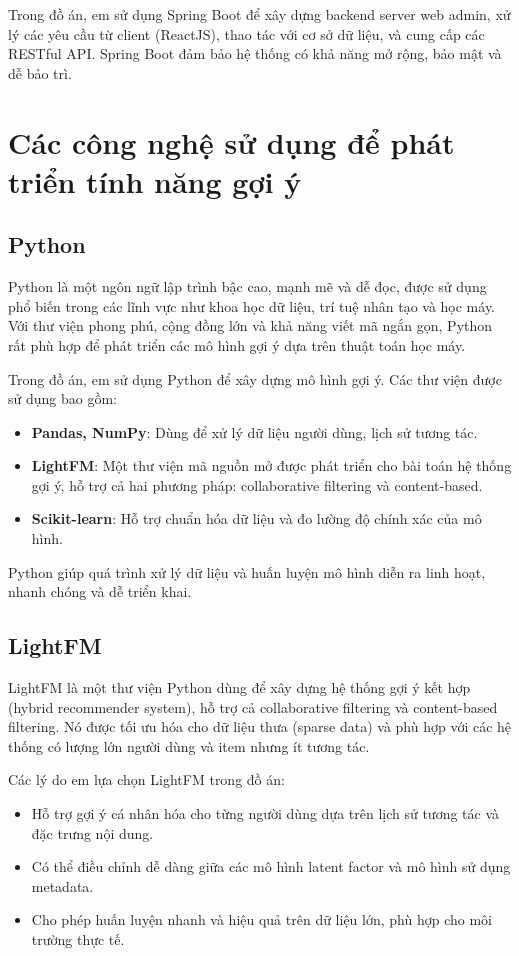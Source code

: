 \documentclass[../DoAn.tex]{subfiles}
\begin{document}
Trong đồ án, em sử dụng Spring Boot để xây dựng backend server web admin, xử lý các yêu cầu từ client (ReactJS), thao tác với cơ sở dữ liệu, và cung cấp các RESTful API. Spring Boot đảm bảo hệ thống có khả năng mở rộng, bảo mật và dễ bảo trì.

\section{Các công nghệ sử dụng để phát triển tính năng gợi ý}

\subsection{Python\cite{Python}}
Python là một ngôn ngữ lập trình bậc cao, mạnh mẽ và dễ đọc, được sử dụng phổ biến trong các lĩnh vực như khoa học dữ liệu, trí tuệ nhân tạo và học máy. Với thư viện phong phú, cộng đồng lớn và khả năng viết mã ngắn gọn, Python rất phù hợp để phát triển các mô hình gợi ý dựa trên thuật toán học máy.

Trong đồ án, em sử dụng Python để xây dựng mô hình gợi ý. Các thư viện được sử dụng bao gồm:
\begin{itemize}
    \item \textbf{Pandas, NumPy}: Dùng để xử lý dữ liệu người dùng, lịch sử tương tác.
    \item \textbf{LightFM}: Một thư viện mã nguồn mở được phát triển cho bài toán hệ thống gợi ý, hỗ trợ cả hai phương pháp: collaborative filtering và content-based.
    \item \textbf{Scikit-learn}: Hỗ trợ chuẩn hóa dữ liệu và đo lường độ chính xác của mô hình.
\end{itemize}
Python giúp quá trình xử lý dữ liệu và huấn luyện mô hình diễn ra linh hoạt, nhanh chóng và dễ triển khai.

\subsection{LightFM\cite{LightFM}}
LightFM là một thư viện Python dùng để xây dựng hệ thống gợi ý kết hợp (hybrid recommender system), hỗ trợ cả collaborative filtering và content-based filtering. Nó được tối ưu hóa cho dữ liệu thưa (sparse data) và phù hợp với các hệ thống có lượng lớn người dùng và item nhưng ít tương tác.

Các lý do em lựa chọn LightFM trong đồ án:
\begin{itemize}
    \item Hỗ trợ gợi ý cá nhân hóa cho từng người dùng dựa trên lịch sử tương tác và đặc trưng nội dung.
    \item Có thể điều chỉnh dễ dàng giữa các mô hình latent factor và mô hình sử dụng metadata.
    \item Cho phép huấn luyện nhanh và hiệu quả trên dữ liệu lớn, phù hợp cho môi trường thực tế.
\end{itemize}
\end{document}
